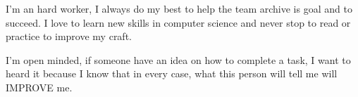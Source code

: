 I'm an hard worker, I always do my best to help the team archive is goal and to succeed. I love to learn new skills in computer science and never stop to read or practice to improve my craft.

I'm open minded, if someone have an idea on how to complete a task, I want to heard it because I know that in every case, what this person will tell me will IMPROVE me.

